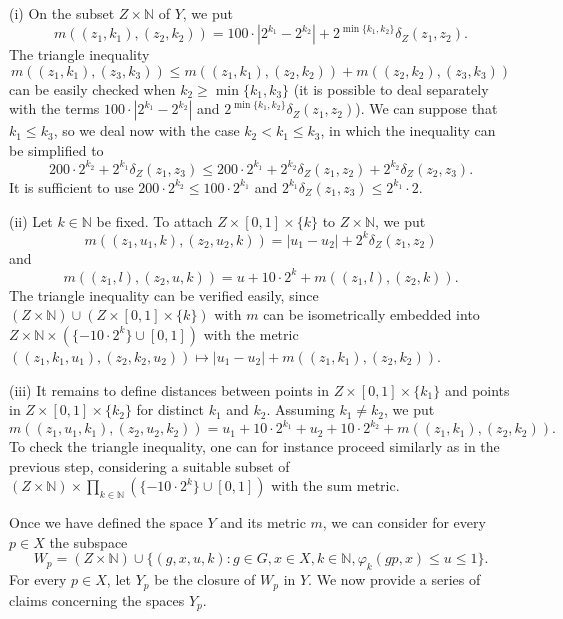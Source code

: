 \documentclass[a4paper]{amsart}
\theoremstyle{plain}
\theoremstyle{remark}
\begin{document}
(i) On the subset $ Z \times \mathbb{N} $ of $ Y $, we put
$$ m((z_{1}, k_{1}), (z_{2}, k_{2})) = 100 \cdot |2^{k_{1}} - 2^{k_{2}}| + 2^{\min \{ k_{1}, k_{2} \} } \delta_{Z}(z_{1}, z_{2}). $$
The triangle inequality
$$ m((z_{1}, k_{1}), (z_{3}, k_{3})) \leq m((z_{1}, k_{1}), (z_{2}, k_{2})) + m((z_{2}, k_{2}), (z_{3}, k_{3})) $$
can be easily checked when $ k_{2} \geq \min \{ k_{1}, k_{3} \} $ (it is possible to deal separately with the terms $ 100 \cdot |2^{k_{1}} - 2^{k_{2}}| $ and $ 2^{\min \{ k_{1}, k_{2} \} } \delta_{Z}(z_{1}, z_{2}) $). We can suppose that $ k_{1} \leq k_{3} $, so we deal now with the case $ k_{2} < k_{1} \leq k_{3} $, in which the inequality can be simplified to
$$ 200 \cdot 2^{k_{2}} + 2^{k_{1}} \delta_{Z}(z_{1}, z_{3}) \leq 200 \cdot 2^{k_{1}} + 2^{k_{2}} \delta_{Z}(z_{1}, z_{2}) + 2^{k_{2}} \delta_{Z}(z_{2}, z_{3}). $$
It is sufficient to use $ 200 \cdot 2^{k_{2}} \leq 100 \cdot 2^{k_{1}} $ and $ 2^{k_{1}} \delta_{Z}(z_{1}, z_{3}) \leq 2^{k_{1}} \cdot 2 $.

(ii) Let $ k \in \mathbb{N} $ be fixed. To attach $ Z \times [0, 1] \times \{ k \} $ to $ Z \times \mathbb{N} $, we put
$$ m((z_{1}, u_{1}, k), (z_{2}, u_{2}, k)) = |u_{1} - u_{2}| + 2^{k} \delta_{Z}(z_{1}, z_{2}) $$
and
$$ m((z_{1}, l), (z_{2}, u, k)) = u + 10 \cdot 2^{k} + m((z_{1}, l), (z_{2}, k)). $$
The triangle inequality can be verified easily, since $ (Z \times \mathbb{N}) \cup (Z \times [0, 1] \times \{ k \}) $ with $ m $ can be isometrically embedded into $ Z \times \mathbb{N} \times (\{ - 10 \cdot 2^{k} \} \cup [0, 1]) $ with the metric $ ((z_{1}, k_{1}, u_{1}), (z_{2}, k_{2}, u_{2})) \mapsto |u_{1} - u_{2}| + m((z_{1}, k_{1}), (z_{2}, k_{2})) $.

(iii) It remains to define distances between points in $ Z \times [0, 1] \times \{ k_{1} \} $ and points in $ Z \times [0, 1] \times \{ k_{2} \} $ for distinct $ k_{1} $ and $ k_{2} $. Assuming $ k_{1} \neq k_{2} $, we put
$$ m((z_{1}, u_{1}, k_{1}), (z_{2}, u_{2}, k_{2})) = u_{1} + 10 \cdot 2^{k_{1}} + u_{2} + 10 \cdot 2^{k_{2}} + m((z_{1}, k_{1}), (z_{2}, k_{2})). $$
To check the triangle inequality, one can for instance proceed similarly as in the previous step, considering a suitable subset of $ (Z \times \mathbb{N}) \times \prod_{k \in \mathbb{N}} (\{ - 10 \cdot 2^{k} \} \cup [0, 1]) $ with the sum metric.

Once we have defined the space $ Y $ and its metric $ m $, we can consider for every $ p \in X $ the subspace
$$ W_{p} = (Z \times \mathbb{N}) \cup \big\{ (g, x, u, k) : g \in G, x \in X, k \in \mathbb{N}, \varphi_{k}(gp, x) \leq u \leq 1 \big\}. $$
For every $ p \in X $, let $ Y_{p} $ be the closure of $ W_{p} $ in $ Y $. We now provide a series of claims concerning the spaces $ Y_{p} $.
\end{document}

